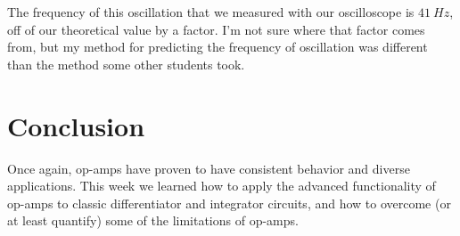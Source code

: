 \documentclass[11pt]{article}
\begin{document}
The frequency of this oscillation that we measured with our oscilloscope is $41\ Hz$, off of our theoretical value by a factor. I'm not sure where that factor comes from, but my method for predicting the frequency of oscillation was different than the method some other students took.\\


\section*{Conclusion}

Once again, op-amps have proven to have consistent behavior and diverse applications. This week we learned how to apply the advanced functionality of op-amps to classic differentiator and integrator circuits, and how to overcome (or at least quantify) some of the limitations of op-amps. \\
\end{document}
